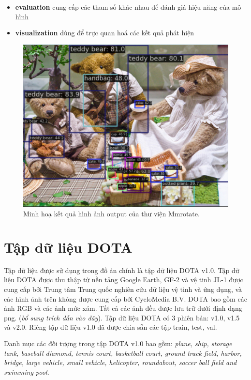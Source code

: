 \documentclass[12pt,a4paper,openany,oneside]{report}
\begin{document}
\begin{itemize}
\begin{itemize}
	\end{itemize}
	\item \textbf{evaluation} cung cấp các tham số khác nhau để đánh giá hiệu năng của mô hình
	\item \textbf{visualization} dùng để trực quan hoá các kết quả phát hiện
	
	
\end{itemize}

\begin{figure}[ht!]
	\begin{center}
		\includegraphics[width=445px]{./demo_mmrotate_result.jpg}
		\caption{Minh hoạ kết quả hình ảnh output của thư viện Mmrotate.}
		\label{demo_mmrotate_result}
	\end{center}
\end{figure} 

\section{Tập dữ liệu DOTA} 

Tập dữ liệu được sử dụng trong đồ án chính là tập dữ liệu DOTA v1.0. Tập dữ liệu DOTA được thu thập từ nền tảng Google Earth, GF-2 và vệ tinh JL-1 được cung cấp bởi Trung tâm Trung quốc nghiên cứu dữ liệu vệ tinh và ứng dụng, và các hình ảnh trên không được cung cấp bởi CycloMedia B.V. DOTA bao gồm các ảnh RGB và các ảnh mức xám. Tất cả các ảnh đều được lưu trữ dưới định dạng png. (\textit{bổ sung trích dẫn vào đây}). Tập dữ liệu DOTA có 3 phiên bản: v1.0, v1.5 và v2.0. Riêng tập dữ liệu v1.0 đã được chia sẵn các tập train, test, val.

Danh mục các đối tượng trong tập DOTA v1.0 bao gồm: \textit{plane, ship, storage tank, baseball diamond, tennis court, basketball court, ground track field, harbor, bridge, large vehicle, small vehicle, helicopter, roundabout, soccer ball field and swimming pool.}
\end{document}
